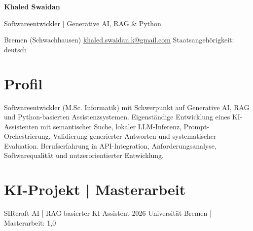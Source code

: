 





    {\fontsize{23}{27}\selectfont
    \bfseries\color{navy}Khaled Swaidan}
\par

\vspace{1pt}

{\color{muted}\large
Softwareentwickler | Generative AI, RAG
\& Python}
\par

\vspace{4pt}

{\small
Bremen (Schwachhausen)
    \quad\textbullet\quad
    \href{mailto:khaled.swaidan.k@gmail.com}
    {khaled.swaidan.k@gmail.com}
    \quad\textbullet\quad
    Staatsangehörigkeit: deutsch
}
\par


\section{Profil}

Softwareentwickler (M.Sc. Informatik) mit Schwerpunkt
auf Generative AI, RAG und Python-basierten
Assistenzsystemen. Eigenständige Entwicklung eines
KI-Assistenten mit semantischer Suche, lokaler
LLM-Inferenz, Prompt-Orchestrierung, Validierung
generierter Antworten und systematischer Evaluation.
Berufserfahrung in API-Integration, Anforderungsanalyse,
Softwarequalität und nutzerorientierter Entwicklung.


\section{KI-Projekt | Masterarbeit}

\cvitem
{SIRcraft AI | RAG-basierter KI-Assistent}
{2026}
{Universität Bremen | Masterarbeit: 1,0}

